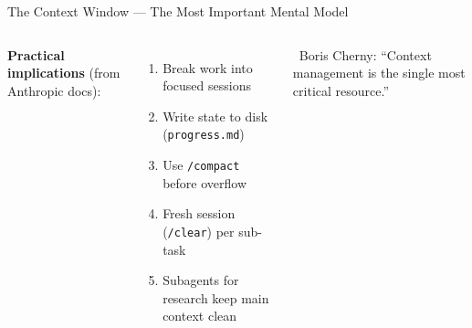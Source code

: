 \documentclass[aspectratio=169,10pt]{beamer}
\newcommand{\emphc}[1]{\textcolor{harvardcrimson}{#1}}
\newcommand{\boristip}[1]{%
  \tikz[baseline=(X.base)]{\node[fill=level4,text=white,
  rounded corners=2pt,inner sep=2pt,font=\tiny\bfseries](X){TIP #1};}}
\begin{document}
\begin{frame}[fragile]{The Context Window --- The Most Important Mental Model}
\begin{columns}[T]
\vspace{0.2em}
\textbf{Practical implications} (from Anthropic docs):
\begin{enumerate}\itemsep0pt
    \item[\scriptsize 1.] Break work into \emphc{focused sessions}
    \item[\scriptsize 2.] Write state to disk (\texttt{progress.md})
    \item[\scriptsize 3.] Use \texttt{/compact} before overflow
    \item[\scriptsize 4.] Fresh session (\texttt{/clear}) per sub-task
    \item[\scriptsize 5.] \emphc{Subagents} for research keep main context clean
\end{enumerate}

\vspace{0.1em}
{\tiny \boristip{1}~Boris Cherny: ``Context management is the single most critical resource.''}
\end{columns}
\end{frame}
\end{document}
